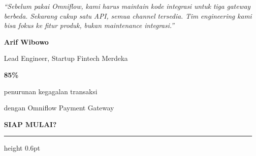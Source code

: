 \documentclass[a4paper]{article}
\newcommand{\sectiontitle}[1]{%
    \vspace{10pt}%
    {\fontsize{13}{16}\selectfont\bfseries\color{BlueDark} #1}\par\vspace{3pt}%
    {\color{BluePrimary}\hrule height 0.6pt}\par\vspace{8pt}%
}
\begin{document}
\noindent
\begin{minipage}[t]{0.485\textwidth}
    \colorbox{BlueBg}{%
        \begin{minipage}{\dimexpr\linewidth-2\fboxsep\relax}
            {\fontsize{9.5}{13}\selectfont\color{TextDark}\textit{``Sebelum pakai Omniflow, kami harus maintain kode integrasi untuk tiga gateway berbeda. Sekarang cukup satu API, semua channel tersedia. Tim engineering kami bisa fokus ke fitur produk, bukan maintenance integrasi.''}}\par\vspace{4pt}
            {\fontsize{8.5}{11}\selectfont\bfseries\color{BluePrimary} Arif Wibowo}\par
            {\fontsize{8}{10}\selectfont\color{TextLight} Lead Engineer, Startup Fintech Merdeka}
        \end{minipage}}
\end{minipage}%
\hfill
\begin{minipage}[t]{0.485\textwidth}
    \colorbox{BlueBg}{%
        \begin{minipage}{\dimexpr\linewidth-2\fboxsep\relax}
            \begin{center}
                {\fontsize{20}{24}\selectfont\bfseries\color{GreenPrimary} 85\%}\par
                {\fontsize{9.5}{12}\selectfont\color{TextDark} penurunan kegagalan transaksi}\par
                {\fontsize{9.5}{12}\selectfont\color{TextDark} dengan Omniflow Payment Gateway}
            \end{center}
        \end{minipage}}
\end{minipage}

\sectiontitle{SIAP MULAI?}
\end{document}
